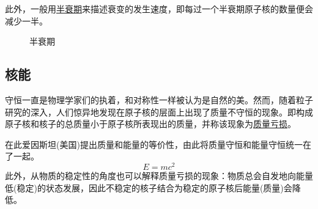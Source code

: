 此外，一般用\underline{半衰期}来描述衰变的发生速度，即每过一个半衰期原子核的数量便会减少一半。
\begin{figure}[ht!]
    \centering
    \caption{半衰期}
\end{figure}

\subsection{核能}

守恒一直是物理学家们的执着，和对称性一样被认为是自然的美。然而，随着粒子研究的深入，人们惊异地发现在原子核的层面上出现了质量不守恒的现象。即构成原子核和核子的总质量小于原子核所表现出的质量，并称该现象为\underline{质量亏损}。

在此爱因斯坦(美国)提出质量和能量的等价性，由此将质量守恒和能量守恒统一在了一起。
\begin{equation*}
    E=mc^2
\end{equation*}
此外，从物质的稳定性的角度也可以解释质量亏损的现象：物质总会自发地向能量低(稳定)的状态发展，因此不稳定的核子结合为稳定的原子核后能量(质量)会降低。

